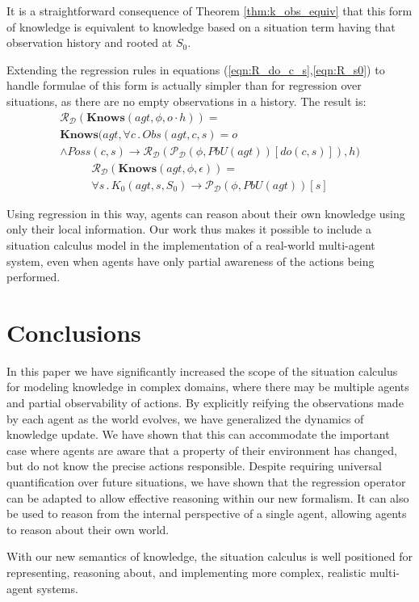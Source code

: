 \documentclass{ifaamas-submission}
\begin{document}
It is a straightforward consequence of Theorem \ref{thm:k_obs_equiv}
that this form of knowledge is equivalent to knowledge based on a
situation term having that observation history and rooted at $S_{0}$.

Extending the regression rules in equations (\ref{eqn:R_do_c_s},\ref{eqn:R_s0})
to handle formulae of this form is actually simpler than for regression
over situations, as there are no empty observations in a history.
The result is: \begin{multline*}
\mathcal{R}_{\mathcal{D}}(\mathbf{Knows}(agt,\phi,o\cdot h))=\\
\mathbf{Knows}(agt,\forall c\,.\, Obs(agt,c,s)=o\\
\wedge Poss(c,s)\rightarrow\mathcal{R}_{\mathcal{D}}(\mathcal{P}_{\mathcal{D}}(\phi,PbU(agt))[do(c,s)]),h)\end{multline*}
\begin{multline*}
\mathcal{R}_{\mathcal{D}}(\mathbf{Knows}(agt,\phi,\epsilon))=\\
\forall s\,.\, K_{0}(agt,s,S_{0})\rightarrow\mathcal{P}_{\mathcal{D}}(\phi,PbU(agt))[s]\end{multline*}


Using regression in this way, agents can reason about their own knowledge
using only their local information. Our work thus makes it possible
to include a situation calculus model in the implementation of a real-world
multi-agent system, even when agents have only partial awareness of
the actions being performed.


\section{Conclusions}

\label{sec:Conclusions}In this paper we have significantly increased
the scope of the situation calculus for modeling knowledge in complex
domains, where there may be multiple agents and partial observability
of actions. By explicitly reifying the observations made by each agent
as the world evolves, we have generalized the dynamics of knowledge
update. We have shown that this can accommodate the important case
where agents are aware that a property of their environment has changed,
but do not know the precise actions responsible. Despite requiring
universal quantification over future situations, we have shown that
the regression operator can be adapted to allow effective reasoning
within our new formalism. It can also be used to reason from the internal
perspective of a single agent, allowing agents to reason about their
own world.

With our new semantics of knowledge, the situation calculus is well
positioned for representing, reasoning about, and implementing more
complex, realistic multi-agent systems.



\end{document}
